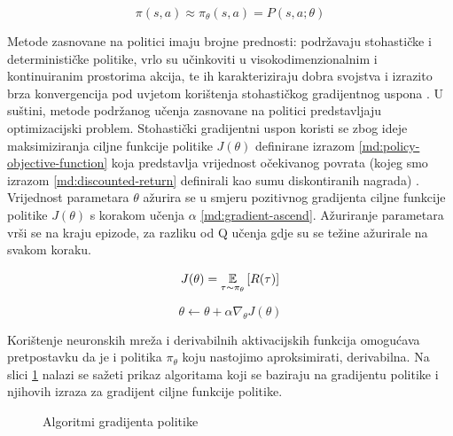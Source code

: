 \begin{equation}
    \label{md:policy-param}
    \pi(s, a) \approx \pi_\theta(s,a) = P(s, a; \theta) 
\end{equation}

\bigskip

Metode zasnovane na politici  imaju brojne prednosti: podržavaju stohastičke i determinističke politike, vrlo su učinkoviti u visokodimenzionalnim i kontinuiranim prostorima akcija, te ih karakteriziraju dobra svojstva i izrazito brza konvergencija pod uvjetom korištenja stohastičkog gradijentnog uspona  \cite{5.prezza}. U suštini, metode podržanog učenja zasnovane na politici predstavljaju optimizacijski problem. Stohastički gradijentni uspon koristi se zbog ideje maksimiziranja ciljne funkcije politike  $J(\theta)$ definirane izrazom \ref{md:policy-objective-function} koja predstavlja vrijednost očekivanog povrata (kojeg smo izrazom \ref{md:discounted-return} definirali kao sumu diskontiranih nagrada) \cite{https://medium.com/@thechrisyoon/deriving-policy-gradients-and-implementing-reinforce-f887949bd63}. Vrijednost parametara $\theta$ ažurira se u smjeru pozitivnog gradijenta ciljne funkcije politike $J(\theta)$ s korakom učenja $\alpha$ \ref{md:gradient-ascend}. Ažuriranje parametara vrši se na kraju epizode, za razliku od Q učenja gdje su se težine ažurirale na svakom koraku.

\begin{equation}
    \label{md:policy-objective-function}
    J(\theta) = \operatorname*{\mathbb{E}}_{\tau \sim \pi_\theta} \left[ R(\tau) \right]
\end{equation}

\begin{equation}
    \label{md:gradient-ascend}
    \theta \leftarrow \theta + \alpha \nabla_\theta J(\theta)
\end{equation}

\bigskip

Korištenje neuronskih mreža i derivabilnih aktivacijskih funkcija omogućava pretpostavku da je i politika $\pi_\theta$ koju nastojimo aproksimirati, derivabilna. Na slici \ref{fig:policy-gradient-algos} nalazi se sažeti prikaz algoritama koji se baziraju na gradijentu politike  i njihovih izraza za gradijent ciljne funkcije politike.

\begin{figure}[H]
    \centering
    \caption{Algoritmi gradijenta politike \cite{https://www.andrew.cmu.edu/course/10-703/slides/Lecture_PG-NatGrad-10-8-2018.pdf}}
    \label{fig:policy-gradient-algos}
\end{figure}

